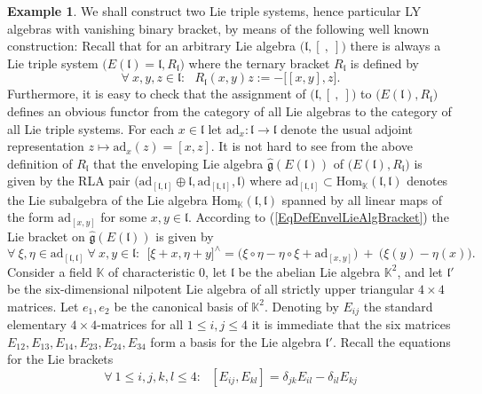 \documentclass [11pt] {article}
\theoremstyle{definition}
\newtheorem{example}[lemma]{Example}
\begin{document}
\begin{example}\label{ExCounterexample}
We shall construct two Lie triple systems, hence particular LY algebras with
vanishing binary bracket, by means of the following well known construction:
Recall that for an arbitrary Lie algebra $\big(\mathfrak{l},[~,~]\big)$
there is always a Lie triple system $\big(E(\mathfrak{l})=\mathfrak{l},R_\mathfrak{l}\big)$  where the ternary bracket $R_\mathfrak{l}$ is defined by
\[
\forall~x,y,z\in\mathfrak{l}:~~~R_\mathfrak{l}(x,y)z:=-\big[[x,y],z\big].
\]
Furthermore, it is easy to check that the assignment of $\big(\mathfrak{l},[~,~]\big)$ to $\big(E(\mathfrak{l}),R_\mathfrak{l}\big)$
defines an obvious functor from the category of all Lie algebras to the category of all Lie triple systems. For each $x\in\mathfrak{l}$ let $\mathrm{ad}_x:\mathfrak{l}\to \mathfrak{l}$ denote
the usual adjoint representation $z\mapsto \mathrm{ad}_x(z)=[x,z]$.
It is not hard to see from the above definition of $R_\mathfrak{l}$ that the enveloping Lie algebra $\hat{\mathfrak{g}}(E(\mathfrak{l}))$ of $\big(E(\mathfrak{l}),R_\mathfrak{l}\big)$
is given by the RLA pair $\big(\mathrm{ad}_{[\mathfrak{l},\mathfrak{l}]}\oplus \mathfrak{l},\mathrm{ad}_{[\mathfrak{l},\mathfrak{l}]},\mathfrak{l}\big)$
where $\mathrm{ad}_{[\mathfrak{l},\mathfrak{l}]}\subset \mathrm{Hom}_\mathbb{K}(\mathfrak{l},\mathfrak{l})$ denotes the Lie subalgebra
of the Lie algebra $\mathrm{Hom}_\mathbb{K}(\mathfrak{l},\mathfrak{l})$ spanned by all linear maps of the form $\mathrm{ad}_{[x,y]}$ for some $x,y\in\mathfrak{l}$.
According to (\ref{EqDefEnvelLieAlgBracket}) the Lie bracket on $\hat{\mathfrak{g}}(E(\mathfrak{l}))$ is given by
\[
	\forall~\xi,\eta\in \mathrm{ad}_{[\mathfrak{l},\mathfrak{l}]}~
	\forall~x,y\in\mathfrak{l}:~~
	\big[\xi+x,\eta+y\big]^\wedge= 
	\big(\xi\circ \eta-\eta\circ\xi+\mathrm{ad}_{[x,y]}\big)
	~+~\big(\xi(y)-\eta(x)\big).
\]	
Consider a field
$\mathbb{K}$ of characteristic $0$, let $\mathfrak{l}$ be the abelian Lie algebra $\mathbb{K}^2$, and let $\mathfrak{l}'$ be the six-dimensional nilpotent Lie algebra of
all strictly upper triangular $4\times 4$ matrices.  Let $e_1,e_2$ be the canonical
basis of $\mathbb{K}^2$. Denoting by $E_{ij}$ the standard elementary 
$4\times 4$-matrices for all $1\leq i,j\leq 4$ it is immediate that the six matrices $E_{12},E_{13}, E_{14}, E_{23}, E_{24}, E_{34}$ form a basis for the
Lie algebra $\mathfrak{l}'$. Recall the equations for the Lie brackets
\[
   \forall~1\leq i,j,k,l\leq 4:~~~  [E_{ij},E_{kl}] =\delta_{jk}E_{il}-\delta_{il}E_{kj}
\]
\end{example}
\end{document}
